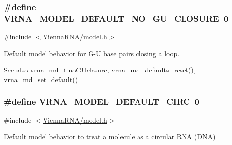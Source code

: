 \subsubsection[{V\+R\+N\+A\+\_\+\+M\+O\+D\+E\+L\+\_\+\+D\+E\+F\+A\+U\+L\+T\+\_\+\+N\+O\+\_\+\+G\+U\+\_\+\+C\+L\+O\+S\+U\+R\+E}]{\setlength{\rightskip}{0pt plus 5cm}\#define V\+R\+N\+A\+\_\+\+M\+O\+D\+E\+L\+\_\+\+D\+E\+F\+A\+U\+L\+T\+\_\+\+N\+O\+\_\+\+G\+U\+\_\+\+C\+L\+O\+S\+U\+R\+E~0}\label{group__model__details_ga5308de46faaca4b9fd16045864901ee7}


{\ttfamily \#include $<$\hyperlink{model_8h}{Vienna\+R\+N\+A/model.\+h}$>$}



Default model behavior for G-\/\+U base pairs closing a loop. 

\begin{DoxySeeAlso}{See also}
\hyperlink{group__model__details_a7e883db1f33f8f3baa5c9b140350c78e}{vrna\+\_\+md\+\_\+t.\+no\+G\+Uclosure}, \hyperlink{group__model__details_ga70834424cf804d149937de89f80ceb45}{vrna\+\_\+md\+\_\+defaults\+\_\+reset()}, \hyperlink{group__model__details_ga8ac6ff84936282436f822644bf841f66}{vrna\+\_\+md\+\_\+set\+\_\+default()} 
\end{DoxySeeAlso}
\hypertarget{group__model__details_ga22059033db7bcd875c51fec32425490a}{}
\subsubsection[{V\+R\+N\+A\+\_\+\+M\+O\+D\+E\+L\+\_\+\+D\+E\+F\+A\+U\+L\+T\+\_\+\+C\+I\+R\+C}]{\setlength{\rightskip}{0pt plus 5cm}\#define V\+R\+N\+A\+\_\+\+M\+O\+D\+E\+L\+\_\+\+D\+E\+F\+A\+U\+L\+T\+\_\+\+C\+I\+R\+C~0}\label{group__model__details_ga22059033db7bcd875c51fec32425490a}


{\ttfamily \#include $<$\hyperlink{model_8h}{Vienna\+R\+N\+A/model.\+h}$>$}



Default model behavior to treat a molecule as a circular R\+N\+A (D\+N\+A) 


